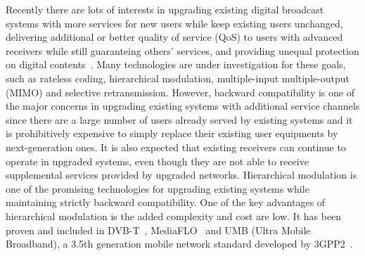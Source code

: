 \documentclass[10pt,fleqn, twocolumn]{IEEEtran}
\begin{document}
Recently there are lots of interests in upgrading existing digital
broadcast systems with more services for new users while keep
existing users unchanged, delivering  additional or better quality
of service (QoS) to users with advanced receivers while still
guaranteing others' services, and providing unequal protection on
digital contents~\cite{DVB,MediaFLO,Jiang05,UMB}. Many
technologies are under investigation for these goals, such as
rateless coding, hierarchical modulation, multiple-input
multiple-output (MIMO) and selective retransmission. However,
backward compatibility is one of the major concerns in upgrading
existing systems with additional service channels since there are
a large number of users already served by existing systems and it
is prohibitively expensive to simply replace their existing user
equipments by next-generation ones. It is also expected that
existing receivers can continue to operate in upgraded systems,
even though they are not able to receive supplemental services
provided by upgraded networks. Hierarchical modulation is one of
the promising technologies for upgrading existing systems while
maintaining strictly backward compatibility. One of the key
advantages of hierarchical modulation is the added complexity and
cost are low. It has been proven and included in DVB-T~\cite{DVB},
MediaFLO~\cite{MediaFLO} and UMB (Ultra Mobile Broadband), a 3.5th
generation mobile network standard developed by 3GPP2~\cite{UMB}.
\end{document}
